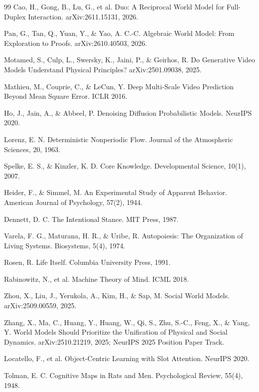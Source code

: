 \documentclass[10pt]{article}
\begin{document}
\begin{thebibliography}{99}
Cao, H., Gong, B., Lu, G., et al. Duo: A Reciprocal World Model for Full-Duplex Interaction. arXiv:2611.15131, 2026.

Pan, G., Tan, Q., Yuan, Y., \& Yao, A. C.-C. Algebraic World Model: From Exploration to Proofs. arXiv:2610.40503, 2026.

Motamed, S., Culp, L., Swersky, K., Jaini, P., \& Geirhos, R. Do Generative Video Models Understand Physical Principles? arXiv:2501.09038, 2025.

Mathieu, M., Couprie, C., \& LeCun, Y. Deep Multi-Scale Video Prediction Beyond Mean Square Error. ICLR 2016.

Ho, J., Jain, A., \& Abbeel, P. Denoising Diffusion Probabilistic Models. NeurIPS 2020.

Lorenz, E. N. Deterministic Nonperiodic Flow. Journal of the Atmospheric Sciences, 20, 1963.

Spelke, E. S., \& Kinzler, K. D. Core Knowledge. Developmental Science, 10(1), 2007.

Heider, F., \& Simmel, M. An Experimental Study of Apparent Behavior. American Journal of Psychology, 57(2), 1944.

Dennett, D. C. The Intentional Stance. MIT Press, 1987.

Varela, F. G., Maturana, H. R., \& Uribe, R. Autopoiesis: The Organization of Living Systems. Biosystems, 5(4), 1974.

Rosen, R. Life Itself. Columbia University Press, 1991.

Rabinowitz, N., et al. Machine Theory of Mind. ICML 2018.

Zhou, X., Liu, J., Yerukola, A., Kim, H., \& Sap, M. Social World Models. arXiv:2509.00559, 2025.

Zhang, X., Ma, C., Huang, Y., Huang, W., Qi, S., Zhu, S.-C., Feng, X., \& Yang, Y. World Models Should Prioritize the Unification of Physical and Social Dynamics. arXiv:2510.21219, 2025; NeurIPS 2025 Position Paper Track.

Locatello, F., et al. Object-Centric Learning with Slot Attention. NeurIPS 2020.

Tolman, E. C. Cognitive Maps in Rats and Men. Psychological Review, 55(4), 1948.


\end{thebibliography}
\end{document}
